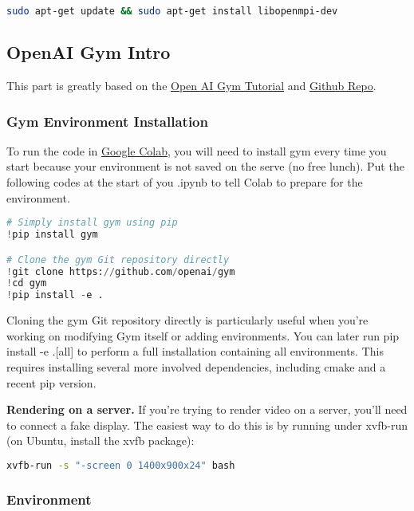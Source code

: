 \begin{lstlisting}[language=bash,caption={Installing OpenMPI on Ubuntu}] 
sudo apt-get update && sudo apt-get install libopenmpi-dev
\end{lstlisting}

\subsection{OpenAI Gym Intro}

This part is greatly based on the \href{https://gym.openai.com/docs/}{Open AI Gym Tutorial} and \href{https://github.com/openai/gym#environment-specific-installation}{Github Repo}.

\subsubsection{Gym Environment Installation}
To run the code in \href{https://colab.research.google.com}{Google Colab}, you will need to install gym every time you start because your environment is not saved on the serve (no free lunch). Put the following codes at the start of you .ipynb to tell Colab to prepare for the environment. 

\begin{lstlisting}[language=python,caption={Google CoLab Preamble}] 
# Simply install gym using pip
!pip install gym  

# Clone the gym Git repository directly
!git clone https://github.com/openai/gym
!cd gym
!pip install -e .
\end{lstlisting}

Cloning the gym Git repository directly is particularly useful when you’re working on modifying Gym itself or adding environments. You can later run pip install -e .[all] to perform a full installation containing all environments. This requires installing several more involved dependencies, including cmake and a recent pip version.

\textbf{Rendering on a server.} If you're trying to render video on a server, you'll need to connect a fake display. The easiest way to do this is by running under xvfb-run (on Ubuntu, install the xvfb package):

\begin{lstlisting}[language=bash,caption={Installing OpenMPI on Ubuntu}] 
xvfb-run -s "-screen 0 1400x900x24" bash
\end{lstlisting}

\subsubsection{Environment}

